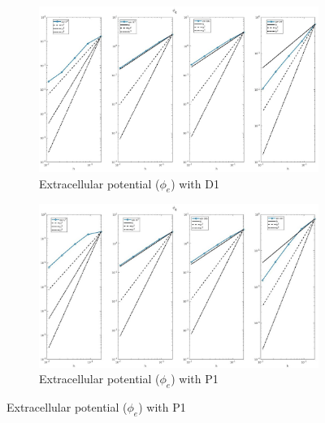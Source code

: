 \documentclass[a4paper,11pt]{article}
\begin{document}
\begin{figure}[H]
\caption{Comparison of the extracellular potential ($\phi_e$)}
\label{phie_1}
\begin{subfigure}{\textwidth}
\begin{center}
\includegraphics[width = \textwidth]{./D1_Phie_1.jpg}
\caption{Extracellular potential ($\phi_e$) with D1}
\end{center}
\end{subfigure}
\begin{subfigure}{\textwidth}
\begin{center}
\includegraphics[width =\textwidth]{./P1_Phie_1.jpg}
\caption{Extracellular potential ($\phi_e$) with P1}
\end{center}
\end{subfigure}
\end{figure}
\newpage
\end{document}
